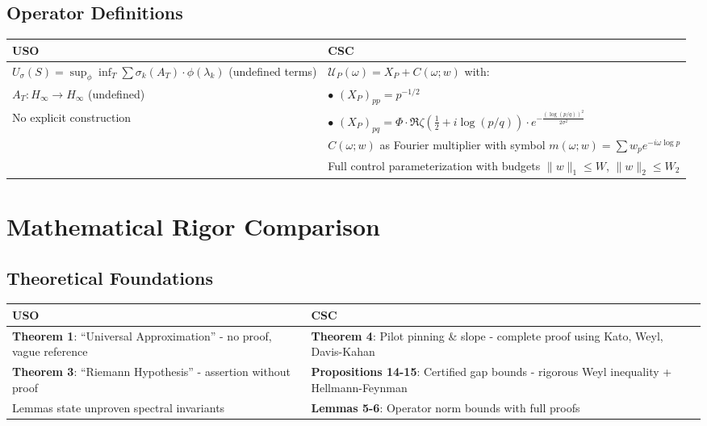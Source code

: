 \documentclass[10pt]{article}
\begin{document}
\subsection*{Operator Definitions}

\begin{table}[h!]
\centering
\begin{tabular}{L{6cm}L{6cm}}
\toprule
\textcolor{usored}{\textbf{USO}} & \textcolor{cscgreen}{\textbf{CSC}} \\
\midrule
$U_\sigma(S) = \sup_{\phi} \inf_T \sum \sigma_k(A_T)\cdot\phi(\lambda_k)$ (undefined terms) & $\mathcal{U}_P(\omega) = X_P + C(\omega; w)$ with: \\
$A_T: H_\infty \to H_\infty$ (undefined) & \quad $\bullet$ $(X_P)_{pp} = p^{-1/2}$ \\
No explicit construction & \quad $\bullet$ $(X_P)_{pq} = \Phi\cdot\Re\zeta(\frac{1}{2} + i\log(p/q))\cdot e^{-\frac{(\log(p/q))^2}{2\sigma^2}}$ \\
& $C(\omega; w)$ as Fourier multiplier with symbol $m(\omega; w) = \sum w_p e^{-i\omega\log p}$ \\
& Full control parameterization with budgets $\|w\|_1 \leq W$, $\|w\|_2 \leq W_2$ \\
\bottomrule
\end{tabular}
\end{table}

\section*{Mathematical Rigor Comparison}

\subsection*{Theoretical Foundations}

\begin{table}[h!]
\centering
\begin{tabular}{L{6cm}L{6cm}}
\toprule
\textcolor{usored}{\textbf{USO}} & \textcolor{cscgreen}{\textbf{CSC}} \\
\midrule
\textbf{Theorem 1}: ``Universal Approximation'' - no proof, vague reference & \textbf{Theorem 4}: Pilot pinning \& slope - complete proof using Kato, Weyl, Davis-Kahan \\
\textbf{Theorem 3}: ``Riemann Hypothesis'' - assertion without proof & \textbf{Propositions 14-15}: Certified gap bounds - rigorous Weyl inequality + Hellmann-Feynman \\
Lemmas state unproven spectral invariants & \textbf{Lemmas 5-6}: Operator norm bounds with full proofs \\
\bottomrule
\end{tabular}
\end{table}
\end{document}
